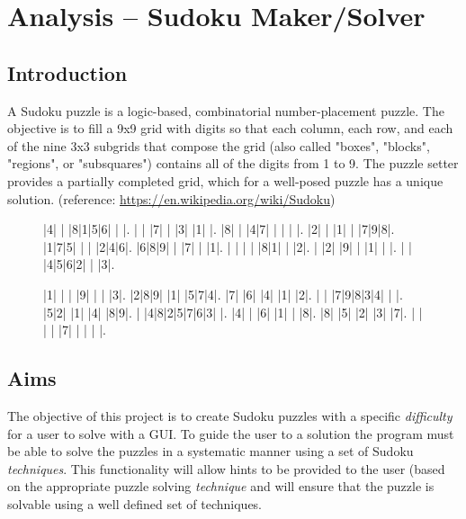 \documentclass[fleqn]{article}
\begin{document}
\section{Analysis – Sudoku Maker/Solver}

\subsection{Introduction}

A Sudoku puzzle is a logic-based, combinatorial number-placement puzzle. The objective is to fill a 9x9 grid with digits so that each column, each row, and each of the nine 3x3 subgrids that compose the grid (also called "boxes", "blocks", "regions", or "subsquares") contains all of the digits from 1 to 9. The puzzle setter provides a partially completed grid, which for a well-posed puzzle has a unique solution. (reference: \url{https://en.wikipedia.org/wiki/Sudoku})


\begin{figure}[!htbp]
\centering
\begin{minipage}{.45\linewidth}
\begin{sudoku}
|4| | |8|1|5|6| | |.
| | |7| | |3| |1| |.
|8| | |4|7| | | | |.
|2| | |1| | |7|9|8|.
|1|7|5| | | |2|4|6|.
|6|8|9| | |7| | |1|.
| | | | |8|1| | |2|.
| |2| |9| | |1| | |.
| | |4|5|6|2| | |3|.
\end{sudoku}
\end{minipage}
\hspace{.05\linewidth}
\begin{minipage}{.45\linewidth}
\begin{sudoku}
|1| | | |9| | | |3|.
|2|8|9| |1| |5|7|4|.
|7| |6| |4| |1| |2|.
| | |7|9|8|3|4| | |.
|5|2| |1| |4| |8|9|.
| |4|8|2|5|7|6|3| |.
|4| | |6| |1| | |8|.
|8| |5| |2| |3| |7|.
| | | | |7| | | | |.
\end{sudoku}
\end{minipage}
\end{figure}


\subsection{Aims}
The objective of this project is to create Sudoku puzzles with a specific \textit{difficulty} for a user to solve with a GUI. To guide the user to a solution the program must be able to solve the puzzles in a systematic manner using a set of Sudoku \textit{techniques}. This functionality will allow hints to be provided to the user (based on the appropriate puzzle solving \textit{technique} and will ensure that the puzzle is solvable using a well defined set of techniques.
\end{document}
